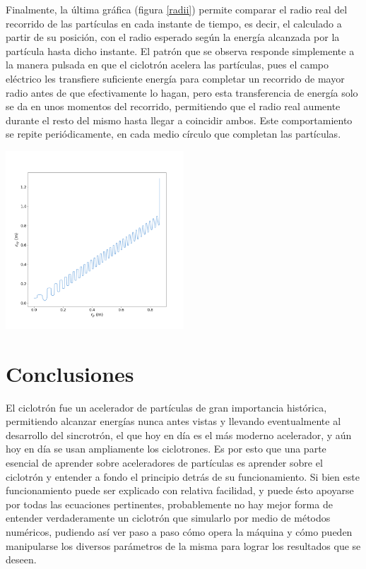 \documentclass[letterpaper, 11pt]{article}
\begin{document}
\begin{multicols}{2}
Finalmente, la última gráfica (figura \ref{radii}) permite comparar el radio real del recorrido de las partículas en cada instante de tiempo, es decir, el calculado a partir de su posición, con el radio esperado según la energía alcanzada por la partícula hasta dicho instante. El patrón que se observa responde simplemente a la manera pulsada en que el ciclotrón acelera las partículas, pues el campo eléctrico les transfiere suficiente energía para completar un recorrido de mayor radio antes de que efectivamente lo hagan, pero esta transferencia de energía solo se da en unos momentos del recorrido, permitiendo que el radio real aumente durante el resto del mismo hasta llegar a coincidir ambos. Este comportamiento se repite periódicamente, en cada medio círculo que completan las partículas.

\begin{center}
    \includegraphics[width=0.5\textwidth]{radii.png}
    \label{radii}
\end{center}

\section{Conclusiones}
El ciclotrón fue un acelerador de partículas de gran importancia histórica, permitiendo alcanzar energías nunca antes vistas y llevando eventualmente al desarrollo del sincrotrón, el que hoy en día es el más moderno acelerador, y aún hoy en día se usan ampliamente los ciclotrones. Es por esto que una parte esencial de aprender sobre aceleradores de partículas es aprender sobre el ciclotrón y entender a fondo el principio detrás de su funcionamiento. Si bien este funcionamiento puede ser explicado con relativa facilidad, y puede ésto apoyarse por todas las ecuaciones pertinentes, probablemente no hay mejor forma de entender verdaderamente un ciclotrón que simularlo por medio de métodos numéricos, pudiendo así ver paso a paso cómo opera la máquina y cómo pueden manipularse los diversos parámetros de la misma para lograr los resultados que se deseen.


\end{multicols}
\end{document}
